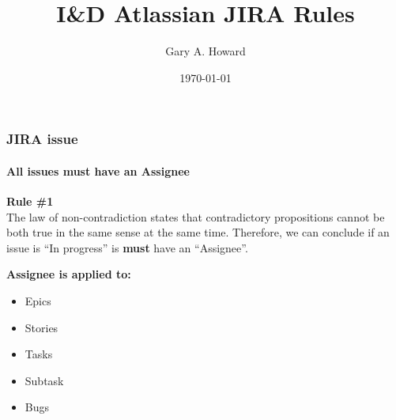 \documentclass[10pt]{beamer}
\title{I\&D Atlassian JIRA Rules}
\date{\today}
\author{Gary A. Howard}
\begin{document}

\begin{frame}
\titlepage%
\end{frame}


\begin{frame}%
  \frametitle{\hspace{7mm}JIRA issue}%
  \framesubtitle{\hspace{7mm}All issues must have an Assignee}%
  \begin{mdframed}[style=HavasuLightBlueStyle]%
    \textbf{Rule \#1}\\%
    The law of non-contradiction states that contradictory propositions cannot
    be both true in the same sense at the same time.  Therefore, we can conclude
    if an issue is ``In progress'' is \textbf{must} have an ``Assignee''.
  \end{mdframed}%
  \begin{mdframed}[style=HavasuLightGreenStyle]%
    \textbf{Assignee is applied to:}%
    \begin{itemize}%
      \item Epics%
      \item Stories%
      \item Tasks%
      \item Subtask%
      \item Bugs%
    \end{itemize}%
  \end{mdframed}%
\end{frame}%

\end{document}
